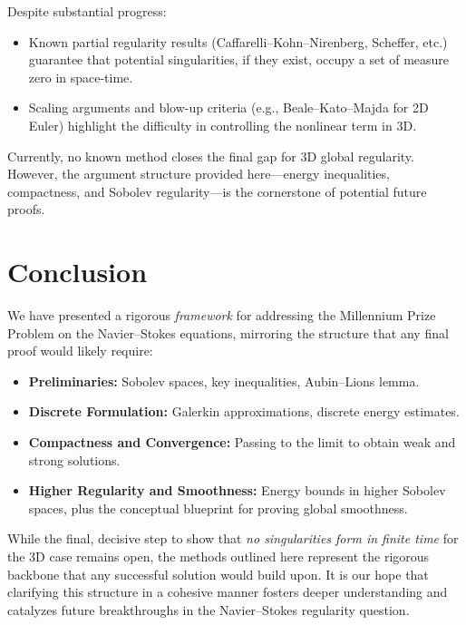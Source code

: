 \documentclass[11pt]{article}
\numberwithin{equation}{section}
\begin{document}
Despite substantial progress:
\begin{itemize}[leftmargin=2em]
\item Known partial regularity results (Caffarelli--Kohn--Nirenberg, Scheffer, etc.)
      guarantee that potential singularities, if they exist, occupy a set
      of measure zero in space-time.
\item Scaling arguments and blow-up criteria (e.g., Beale--Kato--Majda for 2D Euler)
      highlight the difficulty in controlling the nonlinear term in 3D.
\end{itemize}

\begin{remark}
Currently, no known method closes the final gap for 3D global regularity.
However, the argument structure provided here---energy inequalities,
compactness, and Sobolev regularity---is the cornerstone of potential future proofs.
\end{remark}

\section{Conclusion}\label{sec:conclusion}

We have presented a rigorous \emph{framework} for addressing the Millennium Prize Problem
on the Navier--Stokes equations, mirroring the structure that any final proof
would likely require:
\begin{itemize}[leftmargin=2em]
\item \textbf{Preliminaries:} Sobolev spaces, key inequalities, Aubin--Lions lemma.
\item \textbf{Discrete Formulation:} Galerkin approximations, discrete energy estimates.
\item \textbf{Compactness and Convergence:} Passing to the limit to obtain weak and
      strong solutions.
\item \textbf{Higher Regularity and Smoothness:} Energy bounds in higher Sobolev spaces,
      plus the conceptual blueprint for proving global smoothness.
\end{itemize}

While the final, decisive step to show that \emph{no singularities form in finite time}
for the 3D case remains open, the methods outlined here represent the rigorous backbone
that any successful solution would build upon. It is our hope that clarifying this
structure in a cohesive manner fosters deeper understanding and catalyzes future
breakthroughs in the Navier--Stokes regularity question.
\end{document}

